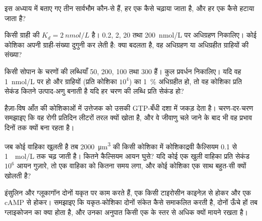 \begin{exercise}[$\star$]\label{exo:b2:cell-signalling:4}
इस अध्याय में बताए गए तीन सार्वभौम  कौन-से हैं,
हर एक कैसे चढ़ाया जाता है, और हर एक कैसे हटाया जाता है?
\end{exercise}

\begin{exercise}[$\star\star$]\label{exo:b2:cell-signalling:5}
किसी ग्राही की $K_d = \qty{2}{nmol/L}$ है। 0.2, 2, 20 तथा
\qty{200}{nmol/L} पर अधिग्रहण निकालिए। कोई कोशिका अपनी ग्राही-संख्या दुगुनी कर लेती है:
क्या बदलता है, वह अधिग्रहण या अधिग्रहीत ग्राहियों की संख्या?
\end{exercise}

\begin{exercise}[$\star\star$]\label{exo:b2:cell-signalling:6}
किसी सोपान के चरणों की लब्धियाँ 50, 200, 100 तथा 300 हैं। कुल
प्रवर्धन निकालिए। यदि वह  \qty{1}{nmol/L} पर हो और
ग्राहियों (प्रति कोशिका $10^{4}$) का \qty{1}{\%} अधिग्रहीत हो, तो
वह कोशिका प्रति सेकंड कितने उत्पाद-अणु बनाती है यदि हर चरण की
लब्धि प्रति सेकंड हो?
\end{exercise}

\begin{exercise}[$\star\star$]\label{exo:b2:cell-signalling:7}
हैज़ा-विष आँत की कोशिकाओं में उत्तेजक  को उसकी GTP-बँधी
दशा में जकड़ देता है। चरण-दर-चरण समझाइए कि वह रोगी प्रतिदिन लीटरों
तरल क्यों खोता है, और वे जीवाणु चले जाने के बाद भी वह प्रभाव दिनों तक क्यों
बना रहता है।
\end{exercise}

\begin{exercise}[$\star\star$]\label{exo:b2:cell-signalling:8}
जब कोई वाहिका खुलती है तब \qty{2000}{\micro m^3} की किसी कोशिका में
कोशिकाद्रवी कैल्सियम \qty{0.1}{} से \qty{1}{\micro
mol/L} तक चढ़ जाती है। कितने
कैल्सियम आयन घुसे? यदि कोई एक खुली वाहिका प्रति सेकंड $10^{6}$
आयन गुज़ारे, तो एक वाहिका को कितना समय लगा, और कोई कोशिका
एक साथ बहुत-सी क्यों खोलती है?
\end{exercise}

\begin{exercise}[$\star\star$]\label{exo:b2:cell-signalling:9}
इंसुलिन और ग्लूकागॉन दोनों यकृत पर काम करते हैं, एक किसी टाइरोसीन
काइनेज़ से होकर और एक cAMP से होकर। समझाइए कि यकृत-कोशिका दोनों संकेत कैसे
समाकलित करती है, दोनों ऊँचे हों तब ग्लाइकोजन का क्या होता है, और
उनका अनुपात किसी एक के स्तर से अधिक क्यों मायने रखता है।
\end{exercise}

